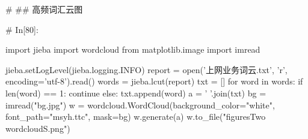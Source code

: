 \documentclass{MathorCupmodeling}
\begin{document}
\begin{python}
# ## 高频词汇云图

# In[80]:


import jieba
import wordcloud
from matplotlib.image import imread

jieba.setLogLevel(jieba.logging.INFO)
report = open('上网业务词云.txt', 'r', encoding='utf-8').read()
words = jieba.lcut(report)
txt = []
for word in words:
    if len(word) == 1:
        continue
    else:
        txt.append(word)
a = ' '.join(txt)
bg = imread("bg.jpg")
w = wordcloud.WordCloud(background_color="white", font_path="msyh.ttc", mask=bg)
w.generate(a)
w.to_file("figuresTwo\\wordcloudS.png")

\end{python}
\newpage
\end{document}
